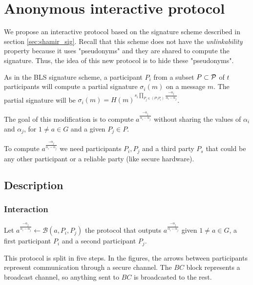 \section{Anonymous interactive protocol}

We propose an interactive protocol based on the signature scheme described in section \ref{sec:shamir_sig}. Recall that this scheme does not have the \textit{unlinkability} property because it uses "pseudonyms" and they are shared to compute the signature. Thus, the idea of this new protocol is to hide these "pseudonyms".

As in the BLS signature scheme, a participant $P_i$ from a subset $P \subset {\mathcal P}$ of $t$ participants will compute a partial signature $\sigma_i (m)$ on a message $m$. The partial signature will be $\sigma_i (m) = H(m)^{s_i \prod_{P_j \in (P \setminus P_i)} \frac{-\alpha_j}{\alpha_i - \alpha_j}}$.

The goal of this modification is to compute $a^\frac{-\alpha_j}{\alpha_i - \alpha_j}$ without sharing the values of $\alpha_i$ and $\alpha_j$, for $1 \neq a \in G$ and a given $P_j \in P$.

To compute $a^\frac{-\alpha_j}{\alpha_i - \alpha_j}$ we need participants $P_i,P_j$ and a third party $P_s$ that could be any other participant or a reliable party (like secure hardware).

\subsection{Description}
\label{sec:inter}
\subsubsection*{Interaction}
Let $a^{\frac{-\alpha_j}{\alpha_i - \alpha_j}} \leftarrow \mathcal{B}(a,P_i,P_j)$ the protocol that outputs $a^{\frac{-\alpha_j}{\alpha_i - \alpha_j}}$ given $1 \neq a \in G$, a first participant $P_i$ and a second participant $P_j$.

This protocol is split in five steps. In the figures, the arrows between participants represent communication through a secure channel. The $BC$ block represents a broadcast channel, so anything sent to $BC$ is broadcasted to the rest. 

